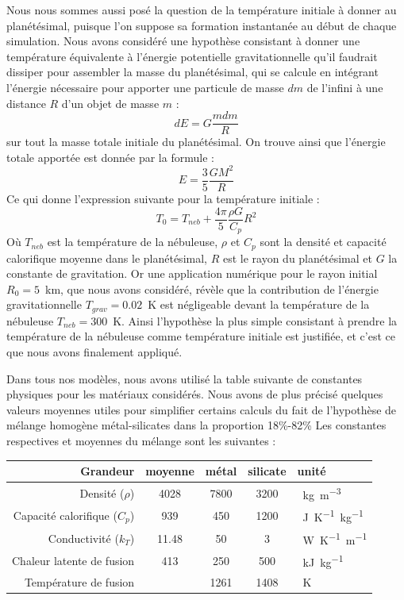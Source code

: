 \documentclass[10pt,a4paper]{article}
\numberwithin{equation}{section}
\begin{document}
Nous nous sommes aussi posé la question de la température initiale à donner au planétésimal, puisque l'on suppose sa formation instantanée au début de chaque simulation. Nous avons considéré une hypothèse consistant à donner une température équivalente à l'énergie potentielle gravitationnelle qu'il faudrait dissiper pour assembler la masse du planétésimal, qui se calcule en intégrant l'énergie nécessaire pour apporter une particule de masse $dm$ de l'infini à une distance $R$ d'un objet de masse $m$ :
$$ dE = G \frac{m dm}{R}$$ sur tout la masse totale initiale du planétésimal. On trouve ainsi que l'énergie totale apportée est donnée par la formule :
$$ E = \frac{3}{5} \frac{GM^2}{R}$$
Ce qui donne l'expression suivante pour la température initiale :
\begin{equation}
T_0 = T_{neb} + \frac{4\pi}{5}\frac{\rho G}{C_p} R^2
\end{equation}
Où $T_{neb}$ est la température de la nébuleuse, $\rho$ et $C_p$ sont la densité et capacité calorifique moyenne dans le planétésimal, $R$ est le rayon du planétésimal et $G$ la constante de gravitation. Or une application numérique pour le rayon initial  $R_0 = 5$\SI{}{km}, que nous avons considéré, révèle que la contribution de l'énergie gravitationnelle $T_{grav} = 0.02$\SI{}{K} est négligeable devant la température de la nébuleuse $T_{neb} = 300$\SI{}{K}. Ainsi l'hypothèse la plus simple consistant à prendre la température de la nébuleuse comme température initiale est justifiée, et c'est ce que nous avons finalement appliqué. 

Dans tous nos modèles, nous avons utilisé la table suivante de constantes physiques pour les matériaux considérés. Nous avons de plus précisé quelques valeurs moyennes utiles pour simplifier certains calculs du fait de l'hypothèse de mélange homogène métal-silicates dans la proportion 18\%-82\%
Les constantes respectives et moyennes du mélange sont les suivantes :
\tabulinesep=0.3mm
\begin{center}
  \begin{tabu}{ r | c c c l}
    Grandeur & moyenne & métal & silicate & unité\\ \hline
    Densité ($\rho$) & 4028 & 7800 &  3200 & \SI{}{kg.m^{-3}}\\ \hline
    Capacité calorifique ($C_p$) & 939 & 450 & 1200 &  \SI{}{J.K^{-1}.kg^{-1}} \\ \hline
    Conductivité ($k_T$)& 11.48 & 50 & 3 & \SI{}{W.K^{-1}.m^{-1}}  \\ \hline    
    Chaleur latente de fusion & 413 & 250 & 500 & \SI{}{kJ.kg^{-1}}\\ \hline
    Température de fusion & & 1261 & 1408 & \SI{}{K}\\ \hline

  \end{tabu}
\end{center}
\end{document}
